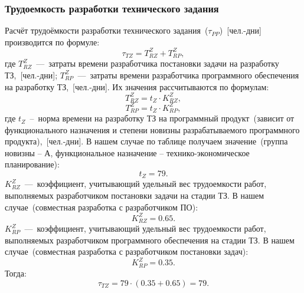         \subsubsection{Трудоемкость разработки технического задания}
            Расчёт трудоёмкости разработки технического задания~($\tau_{PP}$)~[чел.-дни] производится по формуле:
            \begin{equation}
                \tau_{TZ} = T^Z_{RZ} + T^Z_{RP},
            \end{equation}
            где $T^Z_{RZ}$~---~затраты времени разработчика постановки задачи на разработку ТЗ,~[чел.-дни];
            $T^Z_{RP}$~---~затраты времени разработчика программного обеспечения на разработку ТЗ,~[чел.-дни].
            Их значения рассчитываются по формулам:
            \begin{equation}
                T^Z_{RZ} = t_Z  \cdot  K^Z_{RZ},
            \end{equation}
            \begin{equation}
                T^Z_{RP} = t_Z  \cdot  K^Z_{RP},
            \end{equation}
            где $t_Z$~--~норма времени на разработку ТЗ на программный продукт~(зависит от функционального назначения и степени новизны разрабатываемого программного продукта),~[чел.-дни].
            В нашем случае по таблице получаем значение~(группа новизны – А, функциональное назначение – технико-экономическое планирование):
            \begin{equation*}
                t_Z = 79.
            \end{equation*}
            $K^Z_{RZ}$~---~коэффициент, учитывающий удельный вес трудоемкости работ, выполняемых разработчиком постановки задачи на стадии ТЗ.
            В нашем случае~(совместная разработка с разработчиком ПО):
            \begin{equation*}
                K^Z_{RZ} = 0.65.
            \end{equation*}
            $K^Z_{RP}$~---~коэффициент, учитывающий удельный вес трудоемкости работ, выполняемых разработчиком программного обеспечения на стадии ТЗ.
            В нашем случае~(совместная разработка с разработчиком постановки задач):
            \begin{equation*}
                K^Z_{RP} = 0.35.
            \end{equation*}
            Тогда:
            \begin{equation*}
                \tau_{TZ} = 79  \cdot (0.35 + 0.65) = 79.
            \end{equation*}

